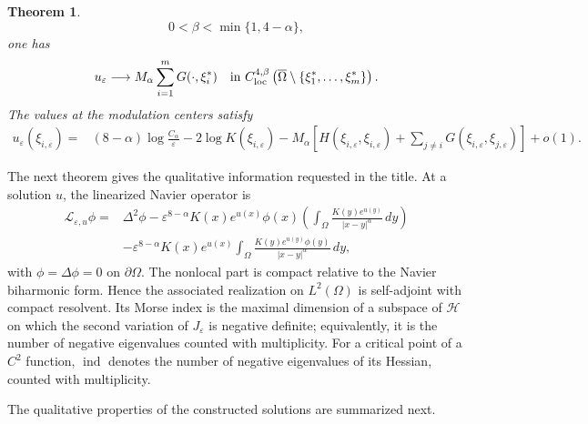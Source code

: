 \documentclass[11pt]{article}
\newtheorem{theorem}{Theorem}[section]
\numberwithin{equation}{section}
\begin{document}
\begin{theorem}
\begin{equation}
0<\beta<\min\{1,4-\alpha\},
\end{equation}
one has
\begin{equation}\label{eq:outer-convergence-intro}
u_\varepsilon
\longrightarrow
M_\alpha\sum_{i=1}^{m}G(\cdot,\xi_i^{*})
\quad\hbox{in }C^{4,\beta}_{\mathrm{loc}}
\left(\overline\Omega\setminus
\{\xi_{1}^{*},\ldots,\xi_{m}^{*}\}\right).
\end{equation}
The values at the modulation centers satisfy
\begin{equation}\label{eq:peak-height-intro}
\begin{aligned}
u_\varepsilon(\xi_{i,\varepsilon})
={}&(8-\alpha)\log\frac{C_\alpha}{\varepsilon}
-2\log K(\xi_{i,\varepsilon})-M_\alpha
\left[
H(\xi_{i,\varepsilon},\xi_{i,\varepsilon})
+\sum_{j\ne i}G(\xi_{i,\varepsilon},\xi_{j,\varepsilon})
\right]
+o(1).
\end{aligned}
\end{equation}
\end{theorem}

The next theorem gives the qualitative information requested in the
title. At a solution $u$, the linearized Navier operator is
\[
\begin{aligned}
\mathscr L_{\varepsilon,u}\phi
={}&\Delta^2\phi
-\varepsilon^{8-\alpha}K(x)e^{u(x)}\phi(x)
\left(\int_\Omega\frac{K(y)e^{u(y)}}{|x-y|^\alpha}\,dy\right)\\
&-\varepsilon^{8-\alpha}K(x)e^{u(x)}
\int_\Omega\frac{K(y)e^{u(y)}\phi(y)}{|x-y|^\alpha}\,dy,
\end{aligned}
\]
with $\phi=\Delta\phi=0$ on $\partial\Omega$. The nonlocal part is
compact relative to the Navier biharmonic form. Hence the associated
realization on $L^2(\Omega)$ is self-adjoint with compact resolvent.
Its Morse index is the maximal dimension of a subspace of
$\mathcal H$ on which the second variation of $J_\varepsilon$ is
negative definite; equivalently, it is the number of negative
eigenvalues counted with multiplicity. For a critical point of a
$C^2$ function, $\operatorname{ind}$ denotes the number of negative
eigenvalues of its Hessian, counted with multiplicity.

The qualitative properties of the constructed solutions are summarized next.
\end{document}
